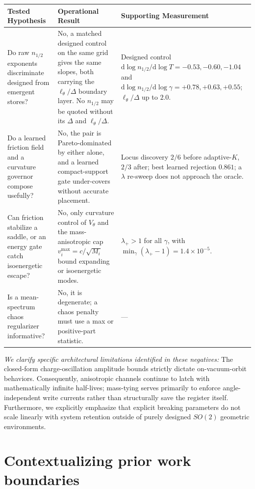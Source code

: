 \documentclass[mlabstract,onecolumn]{jmlr}
\begin{document}
\begin{center}
\begin{tabular}{@{}p{1.52in} p{1.52in} p{2.06in}@{}}
\toprule
Tested Hypothesis & Operational Result & Supporting Measurement \\
\midrule
Do raw $n_{1/2}$ exponents discriminate designed from emergent stores? &
No, a matched designed control on the same grid gives the same slopes, both carrying the $\ell_\theta/\Delta$ boundary layer. No $n_{1/2}$ may be quoted without its $\Delta$ and $\ell_\theta/\Delta$. &
Designed control $\mathrm{d}\log n_{1/2}/\mathrm{d}\log T=-0.53,-0.60,-1.04$ and $\mathrm{d}\log n_{1/2}/\mathrm{d}\log\gamma=+0.78,+0.63,+0.55$; $\ell_\theta/\Delta$ up to $2.0$. \\[2pt]
Do a learned friction field and a curvature governor compose usefully? &
No, the pair is Pareto-dominated by either alone, and a learned compact-support gate under-covers without accurate placement. &
Locus discovery $2/6$ before adaptive-$K$, $2/3$ after; best learned rejection $0.861$; a $\lambda$ re-sweep does not approach the oracle. \\[2pt]
Can friction stabilize a saddle, or an energy gate catch isoenergetic escape? &
No, only curvature control of $V_\theta$ and the mass-anisotropic cap $v_i^{\max}=c/\sqrt{M_i}$ bound expanding or isoenergetic modes. &
$\lambda_+>1$ for all $\gamma$, with $\min_\gamma(\lambda_+-1)=1.4{\times}10^{-5}$. \\[2pt]
Is a mean-spectrum chaos regularizer informative? &
No, it is degenerate; a chaos penalty must use a max or positive-part statistic. &
--- \\[2pt]
\bottomrule
\end{tabular}
\end{center}

\emph{We clarify specific architectural limitations identified in these negatives:} The closed-form charge-oscillation amplitude bounds strictly dictate on-vacuum-orbit behaviors. Consequently, anisotropic channels continue to latch with mathematically infinite half-lives; mass-tying serves primarily to enforce angle-independent write currents rather than structurally save the register itself. Furthermore, we explicitly emphasize that explicit breaking parameters do not scale linearly with system retention outside of purely designed $SO(2)$ geometric environments.

\section{Contextualizing prior work boundaries}\label{app:pos}
\end{document}
